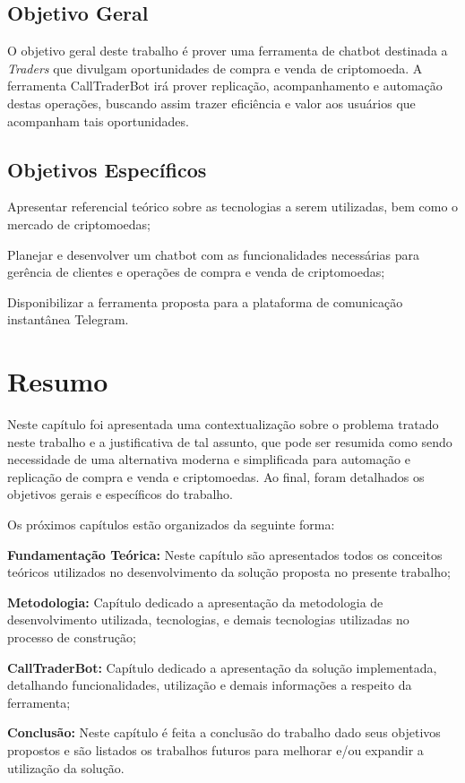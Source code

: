 \subsection{Objetivo Geral}
O objetivo geral deste trabalho é prover uma ferramenta de chatbot destinada a \emph{Traders} que divulgam oportunidades de compra e venda de criptomoeda. A ferramenta CallTraderBot irá prover replicação, acompanhamento e automação destas operações, buscando assim trazer  eficiência e valor aos usuários que acompanham tais oportunidades.

\subsection{Objetivos Específicos}
\begin{lista}
  \item Apresentar referencial teórico sobre as tecnologias a serem utilizadas, bem como o mercado de criptomoedas;
  \item Planejar e desenvolver um chatbot com as funcionalidades necessárias para gerência de clientes e operações de compra e venda de criptomoedas;
  \item Disponibilizar a ferramenta proposta para a plataforma de comunicação instantânea Telegram.
\end{lista}

\section*{Resumo}
Neste capítulo foi apresentada uma contextualização sobre o problema tratado neste trabalho e a justificativa de tal assunto, que pode ser resumida como sendo necessidade de uma alternativa moderna e simplificada para automação e replicação de compra e venda e criptomoedas. Ao final, foram detalhados os objetivos gerais e específicos do trabalho.

Os próximos capítulos estão organizados da seguinte forma:

\begin{lista}
  \item \textbf{Fundamentação Teórica:} Neste capítulo são apresentados todos os conceitos teóricos utilizados no desenvolvimento da solução proposta no presente trabalho;
  \item \textbf{Metodologia:} Capítulo dedicado a apresentação da metodologia de desenvolvimento utilizada, tecnologias, e demais tecnologias utilizadas no processo de construção;
  \item \textbf{CallTraderBot:} Capítulo dedicado a apresentação da solução implementada, detalhando funcionalidades, utilização e demais informações a respeito da ferramenta;
  \item \textbf{Conclusão:} Neste capítulo é feita a conclusão do trabalho dado seus objetivos propostos e são listados os trabalhos futuros para melhorar e/ou expandir a utilização da solução.
\end{lista}